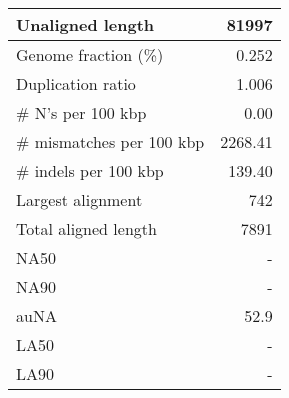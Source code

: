 \documentclass[12pt,a4paper]{article}
\begin{document}
\begin{table}[ht]
\begin{center}
\begin{tabular}{|l*{1}{|r}|}
Unaligned length & 81997 \\ \hline
Genome fraction (\%) & 0.252 \\ \hline
Duplication ratio & 1.006 \\ \hline
\# N's per 100 kbp & 0.00 \\ \hline
\# mismatches per 100 kbp & 2268.41 \\ \hline
\# indels per 100 kbp & 139.40 \\ \hline
Largest alignment & 742 \\ \hline
Total aligned length & 7891 \\ \hline
NA50 & - \\ \hline
NA90 & - \\ \hline
auNA & 52.9 \\ \hline
LA50 & - \\ \hline
LA90 & - \\ \hline
\end{tabular}
\end{center}
\end{table}
\end{document}
